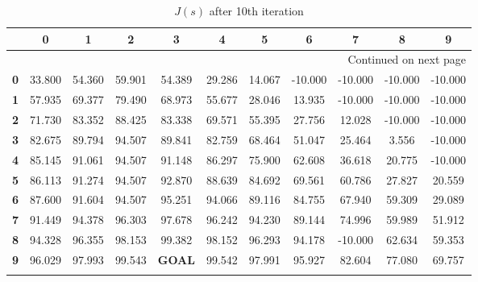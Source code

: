 \documentclass{article}
\begin{document}
\begin{longtable}{|c|c|c|c|c|c|c|c|c|c|c|}
\toprule
{} &       0 &       1 &       2 &       3 &       4 &       5 &       6 &       7 &       8 &       9 \\
\midrule
\endhead
\midrule
\multicolumn{11}{r}{{Continued on next page}} \\
\midrule
\endfoot

\bottomrule
\endlastfoot
\textbf{0} &  33.800 &  54.360 &  59.901 &  54.389 &  29.286 &  14.067 & -10.000 & -10.000 & -10.000 & -10.000 \\\hline
\textbf{1} &  57.935 &  69.377 &  79.490 &  68.973 &  55.677 &  28.046 &  13.935 & -10.000 & -10.000 & -10.000 \\\hline
\textbf{2} &  71.730 &  83.352 &  88.425 &  83.338 &  69.571 &  55.395 &  27.756 &  12.028 & -10.000 & -10.000 \\\hline
\textbf{3} &  82.675 &  89.794 &  94.507 &  89.841 &  82.759 &  68.464 &  51.047 &  25.464 &   3.556 & -10.000 \\\hline
\textbf{4} &  85.145 &  91.061 &  94.507 &  91.148 &  86.297 &  75.900 &  62.608 &  36.618 &  20.775 & -10.000 \\\hline
\textbf{5} &  86.113 &  91.274 &  94.507 &  92.870 &  88.639 &  84.692 &  69.561 &  60.786 &  27.827 &  20.559 \\\hline
\textbf{6} &  87.600 &  91.604 &  94.507 &  95.251 &  94.066 &  89.116 &  84.755 &  67.940 &  59.309 &  29.089 \\\hline
\textbf{7} &  91.449 &  94.378 &  96.303 &  97.678 &  96.242 &  94.230 &  89.144 &  74.996 &  59.989 &  51.912 \\\hline
\textbf{8} &  94.328 &  96.355 &  98.153 &  99.382 &  98.152 &  96.293 &  94.178 & -10.000 &  62.634 &  59.353 \\\hline
\textbf{9} &  96.029 &  97.993 &  99.543 &   \textbf{GOAL} &  99.542 &  97.991&  95.927 &  82.604 &  77.080 &  69.757 \\\hline
\caption{$J(s)$ after 10th iteration}
\end{longtable}
\end{document}
